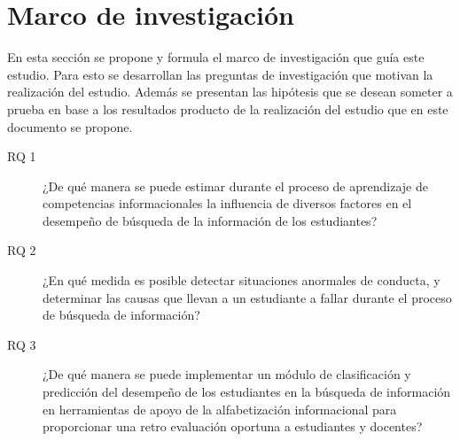 \section{Marco de investigación}
\label{sec:marco_investigacion}
En esta sección se propone y formula el marco de investigación que guía este estudio. Para esto se desarrollan las preguntas de investigación que motivan la realización del estudio. Además se presentan las hipótesis que se desean someter a prueba en base a los resultados producto de la realización del estudio que en este documento se propone. 

\begin{description}
	\item [RQ 1] ¿De qué manera se puede estimar durante el proceso de aprendizaje de competencias informacionales la influencia de diversos factores en el desempeño de búsqueda de la información de los estudiantes?
	\item [RQ 2] ¿En qué medida es posible detectar situaciones anormales de conducta, y determinar las causas que llevan a un estudiante a fallar durante el proceso de búsqueda de información? 
	\item [RQ 3] ¿De qué manera se puede implementar un módulo de clasificación y predicción del desempeño de los estudiantes en la búsqueda de información en herramientas de apoyo de la alfabetización informacional para proporcionar una retro evaluación oportuna a estudiantes y docentes?
\end{description}